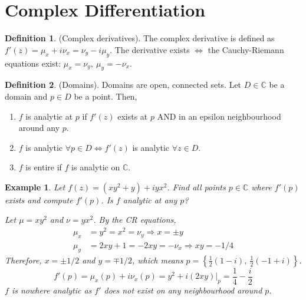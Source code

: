 \documentclass{article}
\newtheorem{example}[theorem]{Example}
\theoremstyle{definition}
\newtheorem{definition}{Definition}[section]
\begin{document}
\section{Complex Differentiation}

\begin{definition}
    (Complex derivatives). The complex derivative is defined as $f'(z) = \mu_x + i \nu_x = \nu_y - i \mu_y$. The derivative exists $\iff$ the Cauchy-Riemann equations exist: $\mu_x = \nu_y,\ \mu_y = -\nu_x$.
\end{definition}

\begin{definition}
    (Domains). Domains are open, connected sets. Let $D \in \mathbb{C}$ be a domain and $p \in D$ be a point. Then,
    \begin{enumerate}
        \item $f$ is analytic at $p$ if $f'(z)$ exists at $p$ AND in an epsilon neighbourhood around any $p$.
        \item $f$ is analytic $\forall p \in D \iff f'(z)$ is analytic $\forall z \in D$.
        \item $f$ is entire if $f$ is analytic on $\mathbb{C}$.
    \end{enumerate}
\end{definition}

\begin{example} \normalfont
    Let $f(z) = (xy^2 + y) + iyx^2$. Find all points $p \in \mathbb{C}$ where $f'(p)$ exists and compute $f'(p)$. Is $f$ analytic at any $p$? \vspace{1em}

    Let $\mu = xy^2$ and $\nu = yx^2$. By the CR equations,
    \begin{align*}
        \mu_x &= y^2 = x^2 = \nu_y \Longrightarrow x = \pm y \\
        \mu_y &= 2xy + 1 = -2xy = -\nu_x \Longrightarrow xy = -1/4
    \end{align*}
    Therefore, $x = \pm 1/2$ and $y = \mp 1/2$, which means $p = \left\{ \frac{1}{2} (1-i),\ \frac{1}{2} (-1+i) \right\}$.
    \begin{equation*}
        f'(p) = \mu_x(p) + i \nu_x(p) = y^2 + i(2xy) |_p = \frac{1}{4} - \frac{i}{2}
    \end{equation*}
    $f$ is nowhere analytic as $f'$ does not exist on any neighbourhood around $p$.
\end{example}
\end{document}
